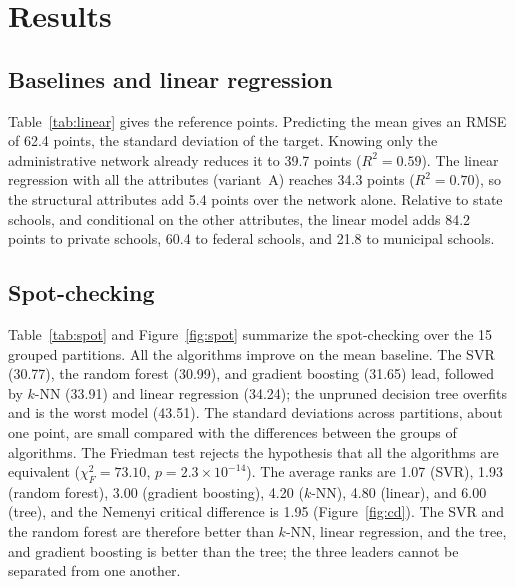 \section{Results}
\label{sec:results}

\subsection{Baselines and linear regression}

Table~\ref{tab:linear} gives the reference points. Predicting the mean gives an RMSE of 62.4
points, the standard deviation of the target. Knowing only the administrative network already
reduces it to 39.7 points ($R^2 = 0.59$). The linear regression with all the attributes
(variant~A) reaches 34.3 points ($R^2 = 0.70$), so the structural attributes add 5.4 points over
the network alone. Relative to state schools, and conditional on the other attributes, the linear
model adds 84.2 points to private schools, 60.4 to federal schools, and 21.8 to municipal schools.

\begin{table}[htbp]
  \centering
  \caption{Baselines and linear regression variants: mean $\pm$ standard deviation over the five
    folds of the first grouped partition.}
  \label{tab:linear}
  \resizebox{\textwidth}{!}{}
\end{table}

\subsection{Spot-checking}

Table~\ref{tab:spot} and Figure~\ref{fig:spot} summarize the spot-checking over the 15 grouped
partitions. All the algorithms improve on the mean baseline. The SVR (30.77), the random forest
(30.99), and gradient boosting (31.65) lead, followed by $k$-NN (33.91) and linear regression
(34.24); the unpruned decision tree overfits and is the worst model (43.51). The standard
deviations across partitions, about one point, are small compared with the differences between
the groups of algorithms. The Friedman test rejects the hypothesis that all the algorithms are
equivalent ($\chi^2_F = 73.10$, $p = 2.3 \times 10^{-14}$). The average ranks are 1.07 (SVR),
1.93 (random forest), 3.00 (gradient boosting), 4.20 ($k$-NN), 4.80 (linear), and 6.00 (tree),
and the Nemenyi critical difference is 1.95 (Figure~\ref{fig:cd}). The SVR and the random forest are therefore better
than $k$-NN, linear regression, and the tree, and gradient boosting is better than the tree; the
three leaders cannot be separated from one another.


